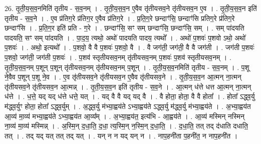\documentclass[17pt]{extarticle}
\begin{document}
26. तृ॒ती॒य॒स॒व॒नमिति॑ तृतीय - स॒व॒नम् । . तृ॒ती॒य॒स॒व॒न ए॒वैव तृ॑तीयसव॒ने तृ॑तीयसव॒न ए॒व । . तृ॒ती॒य॒स॒व॒न इति॑ तृतीय - स॒व॒ने । . ए॒व प्र॑तिग॒रे प्र॑तिग॒र ए॒वैव प्र॑तिग॒रे । . प्र॒ति॒ग॒रे छन्दाꣳ॑सि॒ छन्दाꣳ॑सि प्रतिग॒रे प्र॑तिग॒रे छन्दाꣳ॑सि । . प्र॒ति॒ग॒र इति॑ प्रति - ग॒रे । . छन्दाꣳ॑सि॒ सꣳ सम् छन्दाꣳ॑सि॒ छन्दाꣳ॑सि॒ सम् । . सम् पा॑दयति पादयति॒ सꣳ सम् पा॑दयति । . पा॒द॒य॒ त्यथो॒ अथो॑ पादयति पादय॒ त्यथो᳚ । . अथो॑ प॒शवः॑ प॒शवो ऽथो॒ अथो॑ प॒शवः॑ । . अथो॒ इत्यथो᳚ । . प॒शवो॒ वै वै प॒शवः॑ प॒शवो॒ वै । . वै जग॑ती॒ जग॑ती॒ वै वै जग॑ती । . जग॑ती प॒शवः॑ प॒शवो॒ जग॑ती॒ जग॑ती प॒शवः॑ । . प॒शव॑ स्तृतीयसव॒नम् तृ॑तीयसव॒नम् प॒शवः॑ प॒शव॑ स्तृतीयसव॒नम् । . तृ॒ती॒य॒स॒व॒नम् प॒शून् प॒शून् तृ॑तीयसव॒नम् तृ॑तीयसव॒नम् प॒शून् । . तृ॒ती॒य॒स॒व॒नमिति॑ तृतीय - स॒व॒नम् । . प॒शू ने॒वैव प॒शून् प॒शू ने॒व । . ए॒व तृ॑तीयसव॒ने तृ॑तीयसव॒न ए॒वैव तृ॑तीयसव॒ने । . तृ॒ती॒य॒स॒व॒न आ॒त्मन् ना॒त्मन् तृ॑तीयसव॒ने तृ॑तीयसव॒न आ॒त्मन्न् । . तृ॒ती॒य॒स॒व॒न इति॑ तृतीय - स॒व॒ने । . आ॒त्मन् ध॑त्ते धत्त आ॒त्मन् ना॒त्मन् ध॑त्ते । . ध॒त्ते॒ यद् यद् ध॑त्ते धत्ते॒ यत् । . यद् वै वै यद् यद् वै । . वै होता॒ होता॒ वै वै होता᳚ । . होता᳚ ऽद्ध्व॒र्यु म॑द्ध्व॒र्युꣳ होता॒ होता᳚ ऽद्ध्व॒र्युम् । . अ॒द्ध्व॒र्यु म॑भ्या॒ह्वय॑ते ऽभ्या॒ह्वय॑ते ऽद्ध्व॒र्यु म॑द्ध्व॒र्यु म॑भ्या॒ह्वय॑ते । . अ॒भ्या॒ह्वय॑त आ॒व्य॑ मा॒व्य॑ मभ्या॒ह्वय॑ते ऽभ्या॒ह्वय॑त आ॒व्य᳚म् । . अ॒भ्या॒ह्वय॑त॒ इत्य॑भि - आ॒ह्वय॑ते । . आ॒व्य॑ मस्मिन् नस्मिन् ना॒व्य॑ मा॒व्य॑ मस्मिन्न् । . अ॒स्मि॒न् द॒धा॒ति॒ द॒धा॒ त्य॒स्मि॒न् न॒स्मि॒न् द॒धा॒ति॒ । . द॒धा॒ति॒ तत् तद् द॑धाति दधाति॒ तत् । . तद् यद् यत् तत् तद् यत् । . यन् न न यद् यन् न । . नाप॒हनी॑ता प॒हनी॑त॒ न नाप॒हनी॑त । \newline
\end{document}
